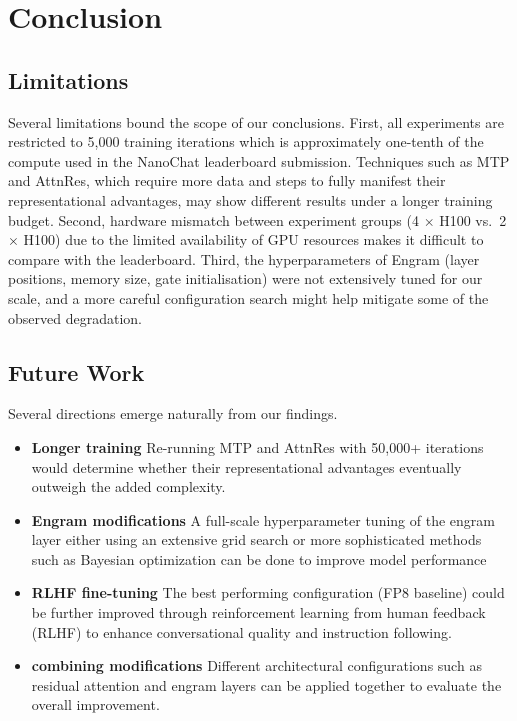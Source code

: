\section{Conclusion}

\subsection{Limitations}

Several limitations bound the scope of our conclusions.
First, all experiments are restricted to 5{,}000 training iterations which is approximately one-tenth of
the compute used in the NanoChat leaderboard submission.
Techniques such as MTP and AttnRes, which require more data and steps to fully manifest their
representational advantages, may show different results under a longer training budget.
Second, hardware mismatch between experiment groups (4 $\times$ H100 vs.\
2 $\times$ H100) due to the limited availability of GPU resources makes it difficult to compare with the leaderboard.
Third, the hyperparameters of Engram (layer positions, memory size, gate initialisation) were not
extensively tuned for our scale, and a more careful configuration search might help mitigate some of
the observed degradation.

\subsection{Future Work}

Several directions emerge naturally from our findings.
\begin{itemize}
  \item \textbf{Longer training}
  Re-running MTP and AttnRes with 50{,}000+ iterations would determine whether their
  representational advantages eventually outweigh the added complexity.
  \item \textbf{Engram modifications}
  A full-scale hyperparameter tuning of the engram layer either using an extensive grid search or more sophisticated methods such as Bayesian optimization can be done to improve model performance
  \item \textbf{RLHF fine-tuning}
  The best performing configuration (FP8 baseline) could be further improved through
  reinforcement learning from human feedback (RLHF) to enhance conversational quality and
  instruction following.
  \item \textbf{combining modifications}
  Different architectural configurations such as residual attention and engram layers can be applied together to evaluate the overall improvement.
\end{itemize}

